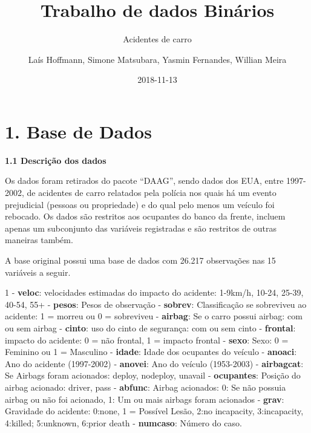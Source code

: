 \documentclass[]{article}
\title{Trabalho de dados Binários}
\subtitle{Acidentes de carro}
\author{Laís Hoffmann, Simone Matsubara, Yasmin Fernandes, Willian Meira}
\date{2018-11-13}
\begin{document}
\maketitle

\hypertarget{base-de-dados}{%
\section{1. Base de Dados}\label{base-de-dados}}

\textbf{1.1 Descrição dos dados}

Os dados foram retirados do pacote ``DAAG'', sendo dados dos EUA, entre
1997-2002, de acidentes de carro relatados pela polícia nos quais há um
evento prejudicial (pessoas ou propriedade) e do qual pelo menos um
veículo foi rebocado. Os dados são restritos aos ocupantes do banco da
frente, incluem apenas um subconjunto das variáveis registradas e são
restritos de outras maneiras também.

A base original possui uma base de dados com 26.217 observações nas 15
variáveis a seguir.

1 - \textbf{veloc}: velocidades estimadas do impacto do acidente:
1-9km/h, 10-24, 25-39, 40-54, 55+  - \textbf{pesos}: Pesos de
observação  - \textbf{sobrev}: Classificação se sobreviveu ao
acidente: 1 = morreu ou 0 = sobreviveu  - \textbf{airbag}: Se
o carro possui airbag: com ou sem airbag  - \textbf{cinto}:
uso do cinto de segurança: com ou sem cinto  -
\textbf{frontal}: impacto do acidente: 0 = não frontal, 1 = impacto
frontal  - \textbf{sexo}: Sexo: 0 = Feminino ou 1 = Masculino
 - \textbf{idade}: Idade dos ocupantes do veículo  -
\textbf{anoaci}: Ano do acidente (1997-2002)  -
\textbf{anovei}: Ano do veículo (1953-2003)  -
\textbf{airbagcat}: Se Airbags foram acionados: deploy, nodeploy,
unavail  - \textbf{ocupantes}: Posição do airbag acionado:
driver, pass  - \textbf{abfunc}: Airbag acionados: 0: Se não
possuia airbag ou não foi acionado, 1: Um ou mais airbags foram
acionados  - \textbf{grav}: Gravidade do acidente: 0:none, 1
= Possível Lesão, 2:no incapacity, 3:incapacity, 4:killed; 5:unknown,
6:prior death  - \textbf{numcaso}: Número do caso.
\end{document}
